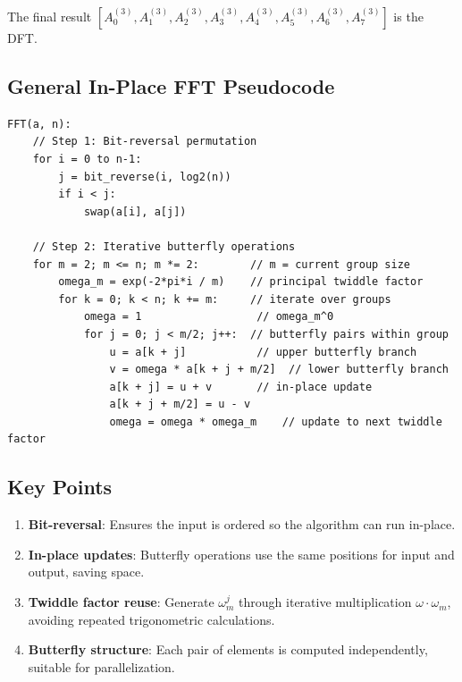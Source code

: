 \documentclass{article}
\begin{document}
The final result $[A_0^{(3)}, A_1^{(3)}, A_2^{(3)}, A_3^{(3)}, A_4^{(3)}, A_5^{(3)}, A_6^{(3)}, A_7^{(3)}]$ is the DFT.

\subsection*{General In-Place FFT Pseudocode}

\begin{verbatim}
FFT(a, n):
    // Step 1: Bit-reversal permutation
    for i = 0 to n-1:
        j = bit_reverse(i, log2(n))
        if i < j:
            swap(a[i], a[j])

    // Step 2: Iterative butterfly operations
    for m = 2; m <= n; m *= 2:        // m = current group size
        omega_m = exp(-2*pi*i / m)    // principal twiddle factor
        for k = 0; k < n; k += m:     // iterate over groups
            omega = 1                  // omega_m^0
            for j = 0; j < m/2; j++:  // butterfly pairs within group
                u = a[k + j]           // upper butterfly branch
                v = omega * a[k + j + m/2]  // lower butterfly branch
                a[k + j] = u + v       // in-place update
                a[k + j + m/2] = u - v
                omega = omega * omega_m    // update to next twiddle factor
\end{verbatim}

\subsection*{Key Points}

\begin{enumerate}
    \item \textbf{Bit-reversal}: Ensures the input is ordered so the algorithm can run in-place.
    \item \textbf{In-place updates}: Butterfly operations use the same positions for input and output, saving space.
    \item \textbf{Twiddle factor reuse}: Generate $\omega_m^j$ through iterative multiplication $\omega \cdot \omega_m$, avoiding repeated trigonometric calculations.
    \item \textbf{Butterfly structure}: Each pair of elements is computed independently, suitable for parallelization.
\end{enumerate}
\end{document}
